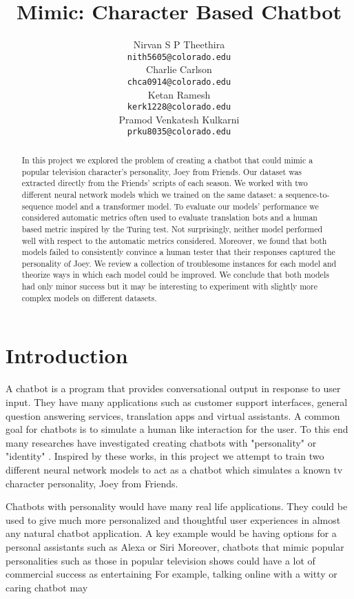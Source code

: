 \documentclass{article}
\title{Mimic: Character Based Chatbot}
\author{%
	Nirvan S P Theethira\\
	\texttt{nith5605@colorado.edu} \\
	\And
	Charlie Carlson\\
	\texttt{chca0914@colorado.edu} \\
	\And
	Ketan Ramesh\\
	\texttt{kerk1228@colorado.edu} \\
	\And
	Pramod Venkatesh Kulkarni\\
	\texttt{prku8035@colorado.edu} \\
}
\begin{document}
	
	\maketitle
	
	\begin{abstract}
		In this project we explored the problem of creating a chatbot that could mimic a popular television character's personality, Joey from Friends.
		Our dataset was extracted directly from the Friends' scripts of each season. 
		We worked with two different neural network models which we trained on the same dataset: a sequence-to-sequence model and a transformer model. 
		To evaluate our models' performance we considered automatic metrics often used to evaluate translation bots and a human based metric inspired by the Turing test.
		Not surprisingly, neither model performed well with respect to the automatic metrics considered.
		Moreover, we found that both models failed to consistently convince a human tester that their responses captured the personality of Joey.
		We review a collection of troublesome instances for each model and theorize ways in which each model could be improved.
		We conclude that both models had only minor success but it may be interesting to experiment with slightly more complex models on different datasets. 
	\end{abstract}
	
	\section{Introduction}
	A chatbot is a program that provides conversational output in response to user input.
	They have many applications such as customer support interfaces, general question answering services, translation apps and virtual assistants.
	A common goal for chatbots is to simulate a human like interaction for the user.
	To this end many researches have investigated creating chatbots with "personality" or "identity" \cite{Li2016, LINH2019, QianHZXZ17, ZhouHZZL17,NMC2017}.
	Inspired by these works, in this project we attempt to train two different neural network models to act as a chatbot which simulates a known tv character personality, Joey from Friends.
	
	Chatbots with personality would have many real life applications.
	They could be used to give much more personalized and thoughtful user experiences in almost any natural chatbot application.
	A key example would be having options for a personal assistants such as Alexa or Siri 
	Moreover, chatbots that mimic popular personalities such as those in popular television shows could have a lot of commercial success as entertaining 
	For example, talking online with a witty or caring chatbot may 
\end{document}
